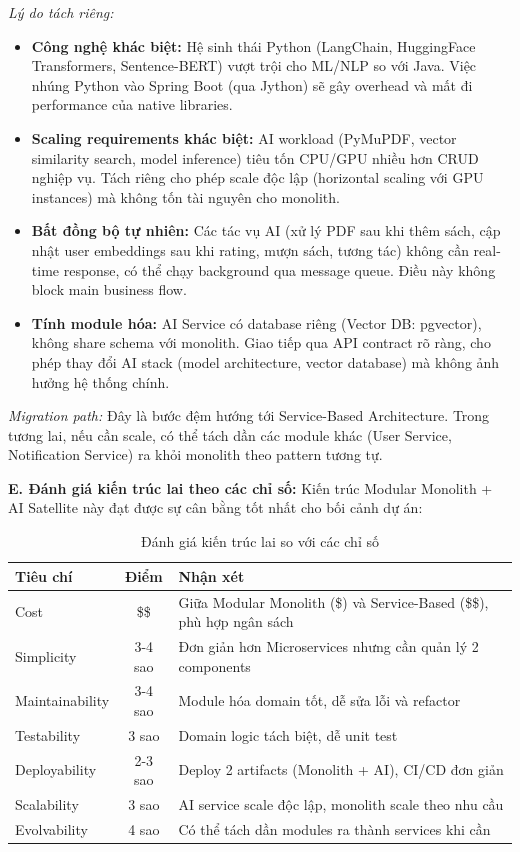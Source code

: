 \begin{enumerate}
    \textit{Lý do tách riêng:}
    \begin{itemize}
        \item \textbf{Công nghệ khác biệt:} Hệ sinh thái Python (LangChain, HuggingFace Transformers, Sentence-BERT) vượt trội cho ML/NLP so với Java. Việc nhúng Python vào Spring Boot (qua Jython) sẽ gây overhead và mất đi performance của native libraries.
        \item \textbf{Scaling requirements khác biệt:} AI workload (PyMuPDF, vector similarity search, model inference) tiêu tốn CPU/GPU nhiều hơn CRUD nghiệp vụ. Tách riêng cho phép scale độc lập (horizontal scaling với GPU instances) mà không tốn tài nguyên cho monolith.
        \item \textbf{Bất đồng bộ tự nhiên:} Các tác vụ AI (xử lý PDF sau khi thêm sách, cập nhật user embeddings sau khi rating, mượn sách, tương tác) không cần real-time response, có thể chạy background qua message queue. Điều này không block main business flow.
        \item \textbf{Tính module hóa:} AI Service có database riêng (Vector DB: pgvector), không share schema với monolith. Giao tiếp qua API contract rõ ràng, cho phép thay đổi AI stack (model architecture, vector database) mà không ảnh hưởng hệ thống chính.
    \end{itemize}
    
    \textit{Migration path:} Đây là bước đệm hướng tới Service-Based Architecture. Trong tương lai, nếu cần scale, có thể tách dần các module khác (User Service, Notification Service) ra khỏi monolith theo pattern tương tự.
\end{enumerate}


\textbf{E. Đánh giá kiến trúc lai theo các chỉ số:}
Kiến trúc Modular Monolith + AI Satellite này đạt được sự cân bằng tốt nhất cho bối cảnh dự án:
\begin{table}[H]
\centering
\caption{Đánh giá kiến trúc lai so với các chỉ số}
\begin{tabular}{|l|c|l|}
\hline
\textbf{Tiêu chí} & \textbf{Điểm} & \textbf{Nhận xét} \\ \hline
Cost & \$\$ & Giữa Modular Monolith (\$) và Service-Based (\$\$), phù hợp ngân sách \\ \hline
Simplicity & 3-4 sao & Đơn giản hơn Microservices nhưng cần quản lý 2 components \\ \hline
Maintainability & 3-4 sao & Module hóa domain tốt, dễ sửa lỗi và refactor \\ \hline
Testability & 3 sao & Domain logic tách biệt, dễ unit test \\ \hline
Deployability & 2-3 sao & Deploy 2 artifacts (Monolith + AI), CI/CD đơn giản \\ \hline
Scalability & 3 sao & AI service scale độc lập, monolith scale theo nhu cầu \\ \hline
Evolvability & 4 sao & Có thể tách dần modules ra thành services khi cần \\ \hline
\end{tabular}
\end{table}

